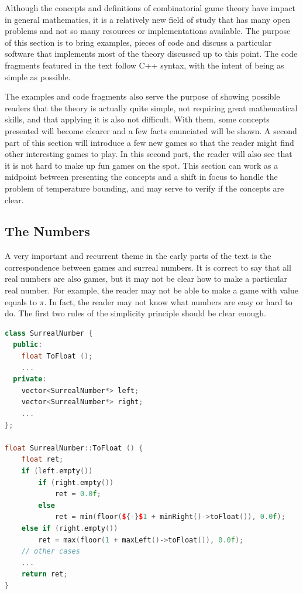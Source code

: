 Although the concepts and definitions of combinatorial game theory have impact in general mathematics, it is a relatively new field of study that has many open problems and not so many resources or implementations available. The purpose of this section is to bring examples, pieces of code and discuss a particular software that implements most of the theory discussed up to this point. The code fragments featured in the text follow C++ syntax, with the intent of being as simple as possible.

The examples and code fragments also serve the purpose of showing possible readers that the theory is actually quite simple, not requiring great mathematical skills, and that applying it is also not difficult. With them, some concepts presented will become clearer and a few facts enunciated will be shown. A second part of this section will introduce a few new games so that the reader might find other interesting games to play. In this second part, the reader will also see that it is not hard to make up fun games on the spot. This section can work as a midpoint between presenting the concepts and a shift in focus to handle the problem of temperature bounding, and may serve to verify if the concepts are clear.

\subsection*{The Numbers}

A very important and recurrent theme in the early parts of the text is the correspondence between games and surreal numbers. It is correct to say that all real numbers are also games, but it may not be clear how to make a particular real number. For example, the reader may not be able to make a game with value equals to $\pi$. In fact, the reader may not know what numbers are easy or hard to do. The first two rules of the simplicity principle should be clear enough.

\begin{lstlisting}[language=C++]
class SurrealNumber {
  public:
	float ToFloat ();
	...
  private:
  	vector<SurrealNumber*> left;
  	vector<SurrealNumber*> right;
  	...
};

float SurrealNumber::ToFloat () {
	float ret;
	if (left.empty())
		if (right.empty())
			ret = 0.0f;
		else
			ret = min(floor(${-}$1 + minRight()->toFloat()), 0.0f);
	else if (right.empty())
		ret = max(floor(1 + maxLeft()->toFloat()), 0.0f);
	// other cases
	...
	return ret;
}
\end{lstlisting}

